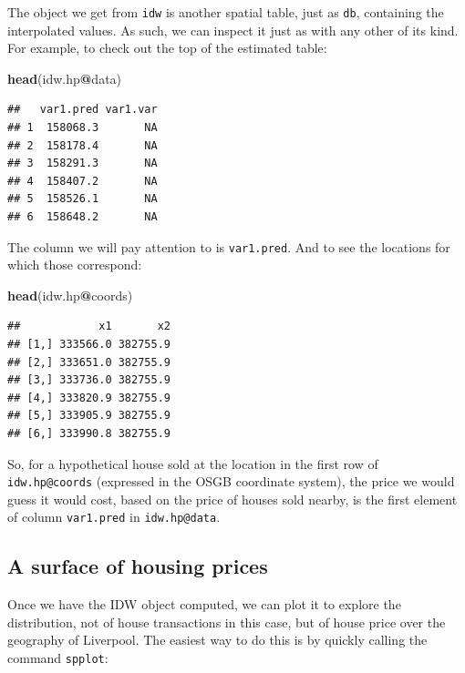 \documentclass[]{book}
\newenvironment{Shaded}{\begin{snugshade}}{\end{snugshade}}
\newcommand{\KeywordTok}[1]{\textcolor[rgb]{0.13,0.29,0.53}{\textbf{#1}}}
\newcommand{\OperatorTok}[1]{\textcolor[rgb]{0.81,0.36,0.00}{\textbf{#1}}}
\newcommand{\NormalTok}[1]{#1}
\begin{document}
The object we get from \texttt{idw} is another spatial table, just as
\texttt{db}, containing the interpolated values. As such, we can inspect
it just as with any other of its kind. For example, to check out the top
of the estimated table:

\begin{Shaded}
\begin{Highlighting}[]
\KeywordTok{head}\NormalTok{(idw.hp}\OperatorTok{@}\NormalTok{data)}
\end{Highlighting}
\end{Shaded}

\begin{verbatim}
##   var1.pred var1.var
## 1  158068.3       NA
## 2  158178.4       NA
## 3  158291.3       NA
## 4  158407.2       NA
## 5  158526.1       NA
## 6  158648.2       NA
\end{verbatim}

The column we will pay attention to is \texttt{var1.pred}. And to see
the locations for which those correspond:

\begin{Shaded}
\begin{Highlighting}[]
\KeywordTok{head}\NormalTok{(idw.hp}\OperatorTok{@}\NormalTok{coords)}
\end{Highlighting}
\end{Shaded}

\begin{verbatim}
##            x1       x2
## [1,] 333566.0 382755.9
## [2,] 333651.0 382755.9
## [3,] 333736.0 382755.9
## [4,] 333820.9 382755.9
## [5,] 333905.9 382755.9
## [6,] 333990.8 382755.9
\end{verbatim}

So, for a hypothetical house sold at the location in the first row of
\texttt{idw.hp@coords} (expressed in the OSGB coordinate system), the
price we would guess it would cost, based on the price of houses sold
nearby, is the first element of column \texttt{var1.pred} in
\texttt{idw.hp@data}.

\subsection{A surface of housing
prices}\label{a-surface-of-housing-prices}

Once we have the IDW object computed, we can plot it to explore the
distribution, not of house transactions in this case, but of house price
over the geography of Liverpool. The easiest way to do this is by
quickly calling the command \texttt{spplot}:
\end{document}
